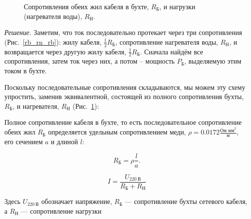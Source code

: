 \documentclass[letterpaper,twoside,12pt]{article}
\begin{document}
\begin{figure}[h]
\begin{minipage}{0.45\textwidth}
        \caption{Сопротивления обеих жил кабеля в бухте, $R_\text{Б}$, и нагрузки (нагревателя воды), $R_\text{Н}$.}
        \label{rb_rn}
    \end{minipage}
\end{figure}



\emph{Решение.} Заметим, что ток последовательно протекает через три сопротивления (Рис.~\ref{rb_rn_rb}): жилу кабеля, $\frac{1}{2} R_\text{Б}$, сопротивление нагревателя воды, $R_\text{Н}$, и возвращается через другую жилу кабеля, $\frac{1}{2} R_\text{Б}$. Сначала найдём все сопротивления, затем ток через них, а потом – мощность $P_\text{Б}$, выделяемую этим током в бухте.

Поскольку последовательные сопротивления складываются, мы можем эту схему упростить, заменив эквивалентной, состоящей из полного сопротивления бухты, $R_\text{Б}$, и нагревателя, $R_\text{Н}$ (Рис.~\ref{rb_rn}):




Полное сопротивление кабеля в бухте, то есть последовательное сопротивление обеих жил $R_\text{Б}$ определяется удельным сопротивлением меди, 
$\rho = 0.0172 \frac{\text{Ом мм}^2}{\text{м}}$, его сечением $a$ и длиной $l$:     %

\begin{equation}
  \label{rbuh}
  R_\text{Б} = \rho\frac{l}{a}.
\end{equation}


\begin{equation}
  \label{ohm_law}
  I = \frac{U_{220~\text{В}}}{R_\text{Б} + R_\text{Н}}
\end{equation}

Здесь $U_{220~\text{В}}$ обозначает напряжение, $R_\text{Б}$ — сопротивление бухты сетевого кабеля, а $R_\text{Н}$ — сопротивление нагрузки
\end{document}
